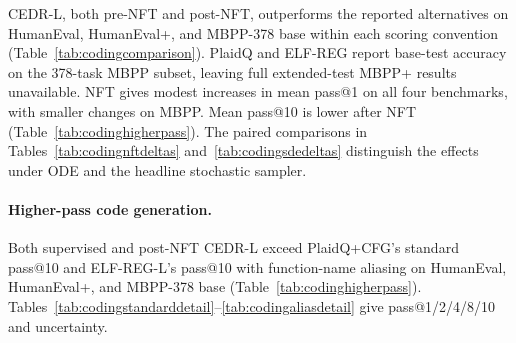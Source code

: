 \documentclass[11pt,letterpaper]{article}
\begin{document}
CEDR-L, both pre-NFT and post-NFT, outperforms the reported alternatives on HumanEval, HumanEval+, and MBPP-378 base within each scoring convention (Table~\ref{tab:codingcomparison}). PlaidQ and ELF-REG report base-test accuracy on the 378-task MBPP subset, leaving full extended-test MBPP+ results unavailable. NFT gives modest increases in mean pass@1 on all four benchmarks, with smaller changes on MBPP. Mean pass@10 is lower after NFT (Table~\ref{tab:codinghigherpass}). The paired comparisons in Tables~\ref{tab:codingnftdeltas} and~\ref{tab:codingsdedeltas} distinguish the effects under ODE and the headline stochastic sampler.

\paragraph{Higher-pass code generation.}
Both supervised and post-NFT CEDR-L exceed PlaidQ+CFG's standard pass@10 and ELF-REG-L's pass@10 with function-name aliasing on HumanEval, HumanEval+, and MBPP-378 base (Table~\ref{tab:codinghigherpass}). Tables~\ref{tab:codingstandarddetail}--\ref{tab:codingaliasdetail} give pass@1/2/4/8/10 and uncertainty.
\end{document}
